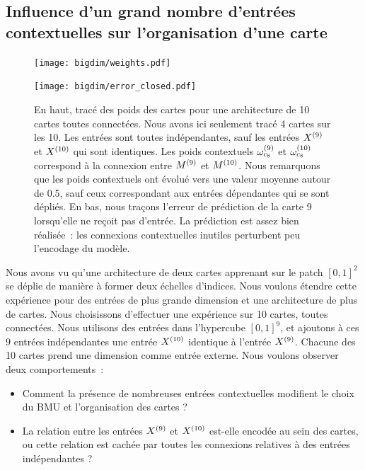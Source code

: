 \documentclass[../main]{subfiles}
\begin{document}
\subsection{Influence d'un grand nombre d'entrées contextuelles sur l'organisation d'une carte}

\begin{figure}
	\begin{minipage}{\textwidth}
	\texttt{[image: bigdim/weights.pdf]}
	\end{minipage}
\begin{minipage}{\textwidth}
	\centering\texttt{[image: bigdim/error\_closed.pdf]}
	\caption{En haut, tracé des poids des cartes pour une architecture de 10 cartes toutes connectées. Nous avons ici seulement tracé 4 cartes sur les 10. Les entrées sont toutes indépendantes, sauf les entrées $X^{({9})}$ et $X^{({10})}$ qui sont identiques. Les poids contextuels $\omega_{c_8}^{({9})}$ et $\omega_{c_8}^{({10})}$ correspond à la connexion entre $M^{({9})}$ et $M^{({10})}$.
	Nous remarquons que les poids contextuels ont évolué vers une valeur moyenne autour de 0.5, sauf ceux correspondant aux entrées dépendantes qui se sont dépliés.
	En bas, nous traçons l'erreur de prédiction de la carte 9 lorsqu'elle ne reçoit pas d'entrée. La prédiction est assez bien réalisée~: les connexions contextuelles inutiles perturbent peu l'encodage du modèle. \label{fig:bigdim}}
\end{minipage}
\end{figure}

Nous avons vu qu'une architecture de deux cartes apprenant sur le patch $[0,1]^2$ se déplie de manière à former deux échelles d'indices. 
Nous voulons étendre cette expérience pour des entrées de plus grande dimension et une architecture de plus de cartes. 
Nous choisissons d'effectuer une expérience sur 10 cartes, toutes connectées.
Nous utilisons des entrées dans l'hypercube $[0,1]^9$, et ajoutons à ces $9$ entrées indépendantes une entrée $X^{({10})}$ identique à l'entrée $X^{({9})}$. Chacune des 10 cartes prend une dimension comme entrée externe.
Nous voulons observer deux comportements~:
\begin{itemize}
	\item Comment la présence de nombreuses entrées contextuelles modifient le choix du BMU et l'organisation des cartes ?
	\item La relation entre les entrées $X^{({9})}$ et $X^{({10})}$ est-elle encodée au sein des cartes, ou cette relation est \og cachée \fg{} par toutes les connexions relatives à des entrées indépendantes ? 
\end{itemize}
\end{document}
